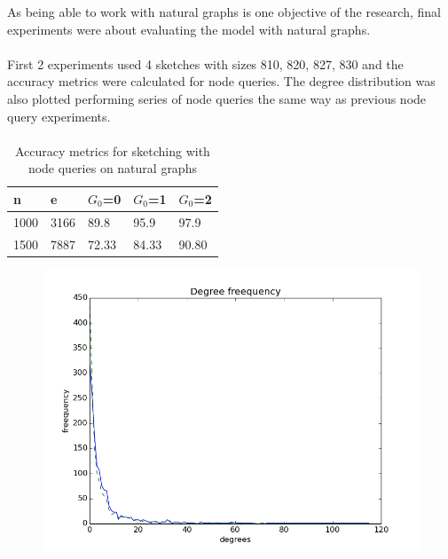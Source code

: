 \documentclass[12pt]{report}
\numberwithin{figure}{section}
\numberwithin{table}{section}
\begin{document}
As being able to work with natural graphs is one objective of the research, final experiments were  about evaluating the model with natural graphs. 

\paragraph{}

First 2 experiments used 4 sketches with sizes 810, 820, 827, 830 and the accuracy metrics were calculated for node queries. The degree distribution was also plotted performing series of node queries the same way as previous node query experiments.

\paragraph{}

\begin{table}[H]
\centering
\begin{tabular}{|l|l|l|l|l|}
\hline
n    & e     & $G_0$=0 & $G_0$=1 & $G_0$=2 \\ \hline
1000 & 3166  & 89.8   & 95.9  & 97.9  \\ \hline
1500 & 7887 & 72.33   & 84.33   & 90.80  \\ \hline
\end{tabular}
\caption{Accuracy metrics for sketching with node queries on natural graphs}
\end{table}


\begin{figure}[H]
\centering
\includegraphics[scale=0.6]{images/GenForestFire-1000-035-035-n1500-e7887-sketches-810-820-827-830plot}
\end{figure}
\end{document}
